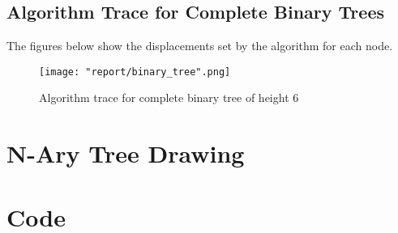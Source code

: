 \documentclass[11pt]{article}
\begin{document}
\subsection*{Algorithm Trace for Complete Binary Trees}
The figures below show the displacements set by the algorithm for each node.

\begin{figure}[H]
    \caption{Algorithm trace for complete binary tree of height 6}
    \texttt{[image: "report/binary\_tree".png]}
\end{figure}

\pagebreak

\section*{N-Ary Tree Drawing}

\pagebreak

\section*{Code}

\end{document}
